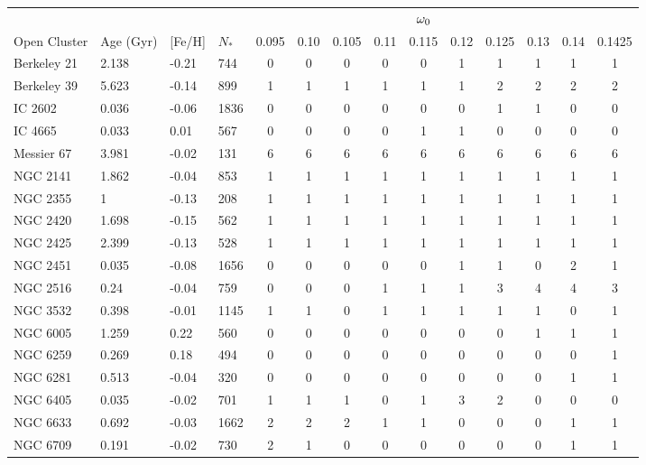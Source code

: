 \documentclass[fleqn,usenatbib]{mnras}
\begin{document}
\begin{table}
	\centering
	\begin{tabular}{|l l l l || c c c c c c c c c c|} 
		\hline
             & & & & & & & & $\omega_{\mathrm{0}}$ & & & & & \\
		Open Cluster & Age (Gyr) & [Fe/H] & $N_*$ & 0.095 & 0.10 & 0.105 & 0.11 & 0.115 & 0.12 & 0.125 & 0.13 & 0.14 & 0.1425\\
		\hline
            Berkeley 21 & 2.138 & -0.21 & 744 & 0 & 0 & 0 & 0 & 0 & 1 & 1 & 1 & 1 & 1\\
            Berkeley 39 & 5.623 & -0.14 & 899 & 1 & 1 & 1 & 1 & 1 & 1 & 2 & 2 & 2 & 2\\
            IC 2602 & 0.036 & -0.06 & 1836 & 0 & 0 & 0 & 0 & 0 & 0 & 1 & 1 & 0 & 0\\
            IC 4665 & 0.033 & 0.01 & 567 & 0 & 0 & 0 & 0 & 1 & 1 & 0 & 0 & 0 & 0\\
            Messier 67 & 3.981 & -0.02 & 131 & 6 & 6 & 6 & 6 & 6 & 6 & 6 & 6 & 6 & 6\\
            NGC 2141 & 1.862 & -0.04 & 853 & 1 & 1 & 1 & 1 & 1 & 1 & 1 & 1 & 1 & 1\\
            NGC 2355 & 1 & -0.13 & 208 & 1 & 1 & 1 & 1 & 1 & 1 & 1 & 1 & 1 & 1\\
            NGC 2420 & 1.698 & -0.15 & 562 & 1 & 1 & 1 & 1 & 1 & 1 & 1 & 1 & 1 & 1\\
            NGC 2425 & 2.399 & -0.13 & 528 & 1 & 1 & 1 & 1 & 1 & 1 & 1 & 1 & 1 & 1\\
            NGC 2451 & 0.035 & -0.08 & 1656 & 0 & 0 & 0 & 0 & 0 & 1 & 1 & 0 & 2 & 1\\
            NGC 2516 & 0.24 & -0.04 & 759 & 0 & 0 & 0 & 1 & 1 & 1 & 3 & 4 & 4 & 3\\
            NGC 3532 & 0.398 & -0.01 & 1145 & 1 & 1 & 0 & 1 & 1 & 1 & 1 & 1 & 0 & 1\\
            NGC 6005 & 1.259 & 0.22 & 560 & 0 & 0 & 0 & 0 & 0 & 0 & 0 & 1 & 1 & 1\\
            NGC 6259 & 0.269 & 0.18 & 494 & 0 & 0 & 0 & 0 & 0 & 0 & 0 & 0 & 0 & 1\\
            NGC 6281 & 0.513 & -0.04 & 320 & 0 & 0 & 0 & 0 & 0 & 0 & 0 & 0 & 1 & 1\\
            NGC 6405 & 0.035 & -0.02 & 701 & 1 & 1 & 1 & 0 & 1 & 3 & 2 & 0 & 0 & 0\\
            NGC 6633 & 0.692 & -0.03 & 1662 & 2 & 2 & 2 & 1 & 1 & 0 & 0 & 0 & 1 & 1\\
            NGC 6709 & 0.191 & -0.02 & 730 & 2 & 1 & 0 & 0 & 0 & 0 & 0 & 0 & 1 & 1\\

\end{tabular}
\end{table}
\end{document}
